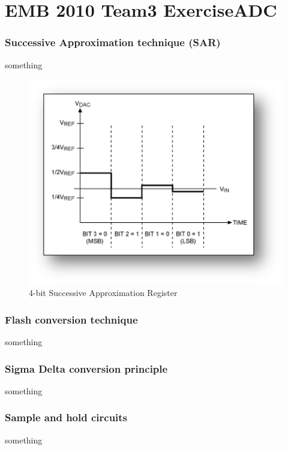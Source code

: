 

\part*{EMB 2010 Team3 ExerciseADC}
\section{Successive Approximation technique (SAR)}
something
\begin{figure}[htbp!]		%
	\begin{centering}
 		\includegraphics[width=1.0\textwidth]{images/sar.png}
		\caption{4-bit Successive Approximation Register}
	\end{centering}
\end{figure}

\section{Flash conversion technique}
something
\section{Sigma Delta conversion principle}
something
\section{Sample and hold circuits}
something
